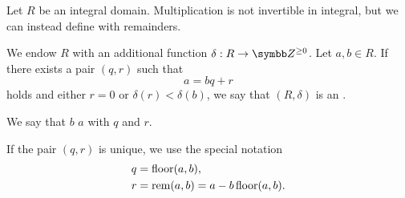 \begin{definition}\label{def:euclidean_domain}\cite{nLab:euclidean_domain}
  Let \( R \) be an integral domain. Multiplication is not invertible in integral, but we can instead define  with remainders.

  We endow \( R \) with an additional function \( \delta: R \to \Z^{\geq 0} \). Let \( a, b \in R \). If there exists a pair \( (q, r) \) such that
  \begin{equation*}
    a = bq + r
  \end{equation*}
  holds and either \( r = 0 \) or \( \delta(r) < \delta(b) \), we say that \( (R, \delta) \) is an .

  We say that \( b \)  \( a \) with  \( q \) and  \( r \).

  If the pair \( (q, r) \) is unique, we use the special notation
  \begin{align*}
    q &= \operatorname{floor}(a, b), \\
    r &= \operatorname{rem}(a, b) = a - b \operatorname{floor}(a, b).
  \end{align*}
\end{definition}

